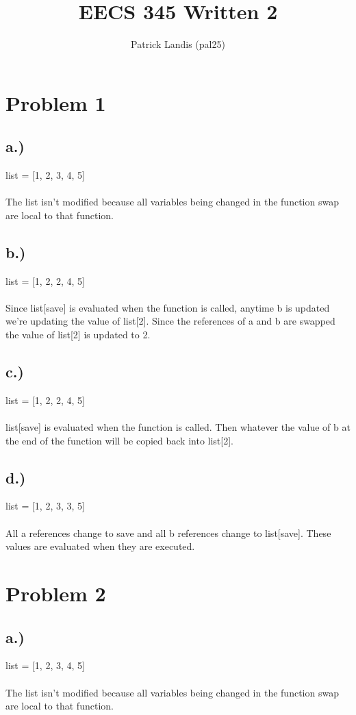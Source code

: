 \documentclass{article}
\title{EECS 345 Written 2}
\author{Patrick Landis (pal25)}
\begin{document}
\maketitle

\section*{Problem 1}
\subsection*{a.)} 
list = [1, 2, 3, 4, 5] \\ \\
The list isn't modified because all variables being changed in the function swap
are local to that function.

\subsection*{b.)}
list = [1, 2, 2, 4, 5] \\ \\
Since list[save] is evaluated when the function is called, anytime b is updated we're
updating the value of list[2]. Since the references of a and b are swapped the value
of list[2] is updated to 2.

\subsection*{c.)}
list = [1, 2, 2, 4, 5] \\ \\
list[save] is evaluated when the function is called. Then whatever the value of b at
the end of the function will be copied back into list[2].

\subsection*{d.)}
list = [1, 2, 3, 3, 5] \\ \\
All a references change to save and all b references change to list[save]. These values
are evaluated when they are executed.

\newpage

\section*{Problem 2}
\subsection*{a.)} 
list = [1, 2, 3, 4, 5] \\ \\
The list isn't modified because all variables being changed in the function swap
are local to that function.
\end{document}
